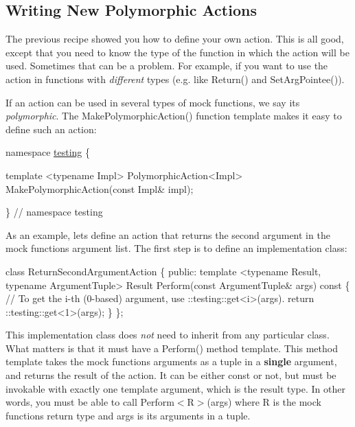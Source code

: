 \subsection*{Writing New Polymorphic Actions}

The previous recipe showed you how to define your own action. This is all good, except that you need to know the type of the function in which the action will be used. Sometimes that can be a problem. For example, if you want to use the action in functions with {\itshape different} types (e.\+g. like {\ttfamily Return()} and {\ttfamily Set\+Arg\+Pointee()}).

If an action can be used in several types of mock functions, we say it\textquotesingle{}s {\itshape polymorphic}. The {\ttfamily Make\+Polymorphic\+Action()} function template makes it easy to define such an action\+:


\begin{DoxyCode}
\textcolor{keyword}{namespace }\hyperlink{namespacetesting}{testing} \{

\textcolor{keyword}{template} <\textcolor{keyword}{typename} Impl>
PolymorphicAction<Impl> MakePolymorphicAction(\textcolor{keyword}{const} Impl& impl);

\}  \textcolor{comment}{// namespace testing}
\end{DoxyCode}


As an example, let\textquotesingle{}s define an action that returns the second argument in the mock function\textquotesingle{}s argument list. The first step is to define an implementation class\+:


\begin{DoxyCode}
\textcolor{keyword}{class }ReturnSecondArgumentAction \{
 \textcolor{keyword}{public}:
  \textcolor{keyword}{template} <\textcolor{keyword}{typename} Result, \textcolor{keyword}{typename} ArgumentTuple>
  Result Perform(\textcolor{keyword}{const} ArgumentTuple& args)\textcolor{keyword}{ const }\{
    \textcolor{comment}{// To get the i-th (0-based) argument, use ::testing::get<i>(args).}
    return ::testing::get<1>(args);
  \}
\};
\end{DoxyCode}


This implementation class does {\itshape not} need to inherit from any particular class. What matters is that it must have a {\ttfamily Perform()} method template. This method template takes the mock function\textquotesingle{}s arguments as a tuple in a {\bfseries single} argument, and returns the result of the action. It can be either {\ttfamily const} or not, but must be invokable with exactly one template argument, which is the result type. In other words, you must be able to call {\ttfamily Perform$<$R$>$(args)} where {\ttfamily R} is the mock function\textquotesingle{}s return type and {\ttfamily args} is its arguments in a tuple.

